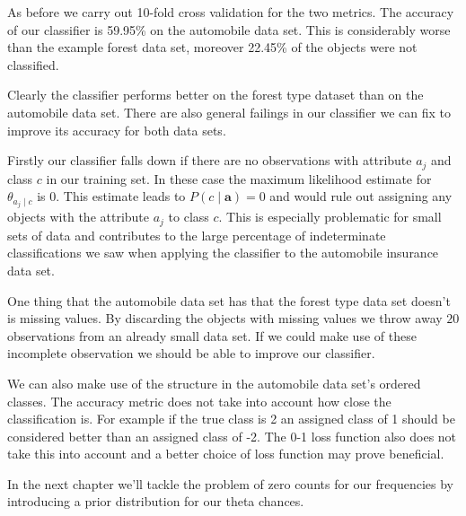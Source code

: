 As before we carry out 10-fold cross validation for the two metrics.
The accuracy of our classifier is 59.95\% on the automobile data set.
This is considerably worse than the example forest data set, moreover 22.45\% of the objects were not classified.

Clearly the classifier performs better on the forest type dataset than on the automobile data set.
There are also general failings in our classifier we can fix to improve its accuracy for both data sets.

Firstly our classifier falls down if there are no observations with attribute $a_j$ and class $c$ in our training set.
In these case the maximum likelihood estimate for $\theta_{a_j \mid c}$ is $0$.
This estimate leads to $P(c \mid \mathbf{a}) = 0$ and would rule out assigning any objects with the attribute $a_j$ to class $c$.
This is especially problematic for small sets of data and contributes to the large percentage of indeterminate classifications we saw when applying the classifier to the automobile insurance data set.

One thing that the automobile data set has that the forest type data set doesn't is missing values.
By discarding the objects with missing values we throw away $20$ observations from an already small data set.
If we could make use of these incomplete observation we should be able to improve our classifier.

We can also make use of the structure in the automobile data set's ordered classes.
The accuracy metric does not take into account how close the classification is.
For example if the true class is 2 an assigned class of 1 should be considered better than an assigned class of -2.
The 0-1 loss function also does not take this into account and a better choice of loss function may prove beneficial.

In the next chapter we'll tackle the problem of zero counts for our frequencies by introducing a prior distribution for our theta chances.